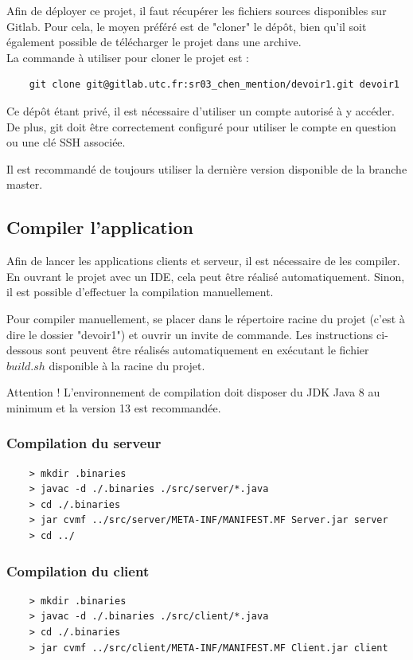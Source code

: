 \documentclass[10pt,a4paper]{article}
\begin{document}
	Afin de déployer ce projet, il faut récupérer les fichiers sources disponibles sur Gitlab. Pour cela, le moyen préféré est de "cloner" le dépôt, bien qu'il soit également possible de télécharger le projet dans une archive.\\
	
	La commande à utiliser pour cloner le projet est :
	\begin{verbatim}
	git clone git@gitlab.utc.fr:sr03_chen_mention/devoir1.git devoir1
	\end{verbatim}
	 Ce dépôt étant privé, il est nécessaire d'utiliser un compte autorisé à y accéder. De plus, git doit être correctement configuré pour utiliser le compte en question ou une clé SSH associée.
	 
	 Il est recommandé de toujours utiliser la dernière version disponible de la branche master. 
	
	\subsection{Compiler l'application}
	
	Afin de lancer les applications clients et serveur, il est nécessaire de les compiler. En ouvrant le projet avec un IDE, cela peut être réalisé automatiquement. Sinon, il est possible d'effectuer la compilation manuellement.
	
	Pour compiler manuellement, se placer dans le répertoire racine du projet (c'est à dire le dossier "devoir1") et ouvrir un invite de commande. Les instructions ci-dessous sont peuvent être réalisés automatiquement en exécutant le fichier $build.sh$ disponible à la racine du projet.
	
	\color{red}Attention ! \color{black} L'environnement de compilation doit disposer du JDK Java 8 au minimum et la version 13 est recommandée.
	
	\subsubsection{Compilation du serveur}
	\begin{verbatim}
	> mkdir .binaries
	> javac -d ./.binaries ./src/server/*.java
	> cd ./.binaries
	> jar cvmf ../src/server/META-INF/MANIFEST.MF Server.jar server
	> cd ../
	\end{verbatim}
	
	\subsubsection{Compilation du client}
	\begin{verbatim}
	> mkdir .binaries
	> javac -d ./.binaries ./src/client/*.java
	> cd ./.binaries
	> jar cvmf ../src/client/META-INF/MANIFEST.MF Client.jar client
	\end{verbatim}
	
\end{document}
